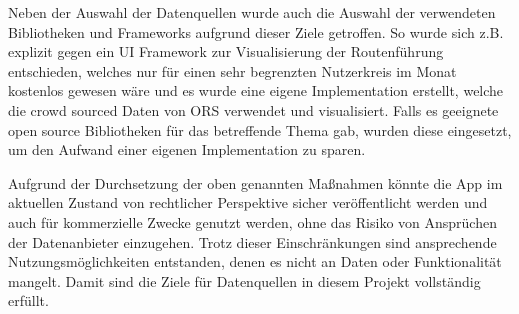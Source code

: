 	\vspace{0.25cm}
	
	Neben der Auswahl der Datenquellen wurde auch die Auswahl der verwendeten Bibliotheken und Frameworks aufgrund dieser Ziele getroffen. So wurde sich z.B. explizit gegen ein UI Framework zur Visualisierung der Routenführung entschieden, welches nur für einen sehr begrenzten Nutzerkreis im Monat kostenlos gewesen wäre und es wurde eine eigene Implementation erstellt, welche die crowd sourced Daten von \acs{ORS} verwendet und visualisiert. Falls es geeignete open source Bibliotheken für das betreffende Thema gab, wurden diese eingesetzt, um den Aufwand einer eigenen Implementation zu sparen.
	
	\vspace{0.25cm}
	
	Aufgrund der Durchsetzung der oben genannten Maßnahmen könnte die App im aktuellen Zustand von rechtlicher Perspektive sicher veröffentlicht werden und auch für kommerzielle Zwecke genutzt werden, ohne das Risiko von Ansprüchen der Datenanbieter einzugehen. Trotz dieser Einschränkungen sind ansprechende Nutzungsmöglichkeiten entstanden, denen es nicht an Daten oder Funktionalität mangelt. Damit sind die Ziele für Datenquellen in diesem Projekt vollständig erfüllt.